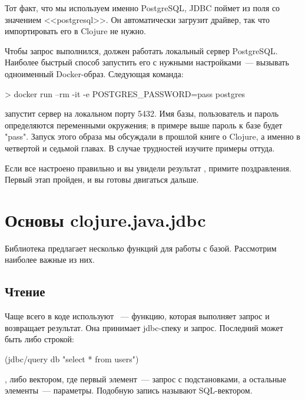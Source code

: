 Тот факт, что мы используем именно PostgreSQL, JDBC поймет из поля  со значением <<postgresql>>. Он автоматически загрузит драйвер, так что импортировать его в Clojure не нужно.

Чтобы запрос выполнился, должен работать локальный сервер PostgreSQL. Наиболее быстрый способ запустить его с нужными настройками~--- вызывать одноименный Docker-образ. Следующая команда:

\begin{english}
  \begin{bash}
> docker run --rm -it -e POSTGRES_PASSWORD=pass postgres
  \end{bash}
\end{english}

\noindent
запустит сервер на локальном порту 5432. Имя базы, пользователь и пароль определяются переменными окружения; в примере выше пароль к базе будет "pass". Запуск этого образа мы обсуждали в прошлой книге о Clojure, а именно в четвертой и седьмой главах. В случае трудностей изучите примеры оттуда.

Если все настроено правильно и вы увидели результат , примите поздравления. Первый этап пройден, и вы готовы двигаться дальше.

\section{Основы clojure.java.jdbc}

Библиотека предлагает несколько функций для работы с базой. Рассмотрим наиболее важные из них.

\subsection{Чтение}

Чаще всего в коде используют ~--- функцию, которая выполняет запрос и возвращает результат. Она принимает jdbc-спеку и запрос. Последний может быть либо строкой:

\begin{english}
  \begin{clojure}
(jdbc/query db "select * from users")
  \end{clojure}
\end{english}

\noindent
, либо вектором, где первый элемент~--- запрос с подстановками, а остальные элементы~--- параметры. Подобную запись называют SQL-вектором.

